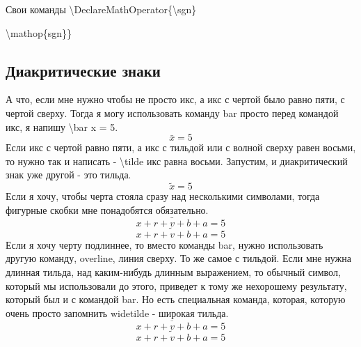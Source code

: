 \documentclass[a4paper,12pt]{article} %
\begin{document}
 Свои команды
 \textbackslash DeclareMathOperator\{\textbackslash sgn\}{\textbackslash mathop\{sgn\}\}
\subsection{Диакритические знаки}
А что, если мне нужно чтобы не просто икс, а икс с чертой было равно пяти, с чертой
сверху. Тогда я могу использовать команду bar
просто перед командой икс, я напишу \textbackslash bar x = 5.
\[\bar x = 5\]
Если икс с чертой равно пяти, а икс
с тильдой или с волной сверху равен восьми, то нужно так и
написать - \textbackslash tilde икс равна восьми. Запустим, и диакритический знак уже другой -
это тильда.
\[\tilde x=5\]
Если я хочу, чтобы черта стояла сразу над
несколькими символами, тогда фигурные скобки мне понадобятся
обязательно.
\[\bar{x+r+v+b+a}=5\]
\[\tilde{x+r+v+b+a}=5\]
Если я хочу черту подлиннее, то вместо
команды bar, нужно использовать другую команду,
overline, линия сверху. То же самое с тильдой. Если мне нужна длинная тильда, над
каким-нибудь длинным выражением, то обычный символ,
который мы использовали до этого, приведет к тому же нехорошему результату, который был и с
командой bar. Но есть специальная команда, которая,
которую очень просто запомнить widetilde - широкая
тильда.
\[\overline{x+r+v+b+a}=5\]
\[\widetilde{x+r+v+b+a}=5\]

}
\end{document}
